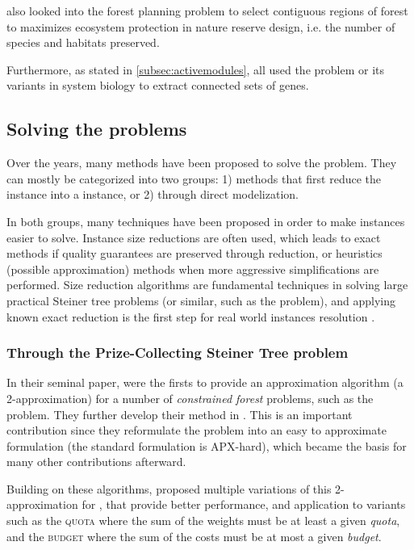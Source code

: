 		\Textcite{carvajal2013imposing} also looked into the forest planning problem to select contiguous regions of forest to maximizes ecosystem protection in nature reserve design, i.e. the number of species and habitats preserved.

		Furthermore, as stated in \cref{subsec:activemodules}, \textcites{dittrich2008identifying}{yamamoto2009better}{backes2012integer}{mitra2013integrative} all used the \mwcs{} problem or its variants in system biology to extract connected sets of genes.


	\subsection{Solving the \mwcs{} problems}
	\label{subsec:solvingmwcs}

	Over the years, many methods have been proposed to solve the \mwcs{} problem.
	They can mostly be categorized into two groups: 1) methods that first reduce the \mwcs{} instance into a \pcst{} instance, or 2) through direct modelization.

	In both groups, many techniques have been proposed in order to make instances easier to solve.
	Instance size reductions are often used, which leads to exact methods if quality guarantees are preserved through reduction, or heuristics (possible approximation) methods when more aggressive simplifications are performed.
	Size reduction algorithms are fundamental techniques in solving large practical Steiner tree problems (or similar, such as the \mwcs{} problem), and applying known exact reduction is the first step for real world instances resolution \parencite{polzin2003algorithms}.

	\subsubsection{Through the Prize-Collecting Steiner Tree problem}

		In their seminal paper, \textcite{goemans1995general} were the firsts to provide an approximation algorithm (a 2-approximation) for a number of \emph{constrained forest} problems, such as the \pcst{} problem.
		They further develop their method in \parencite{goemans1997primal}.
		This is an important contribution since they reformulate the problem into an easy to approximate formulation (the standard formulation is APX-hard), which became the basis for many other contributions afterward.

		Building on these algorithms, \textcite{johnson2000prize} proposed multiple variations of this 2-approximation for \pcst{}, that provide better performance, and application to variants such as the \textsc{quota \pcst{}} where the sum of the weights must be at least a given \emph{quota}, and the \textsc{budget \pcst{}} where the sum of the costs must be at most a given \emph{budget}.

